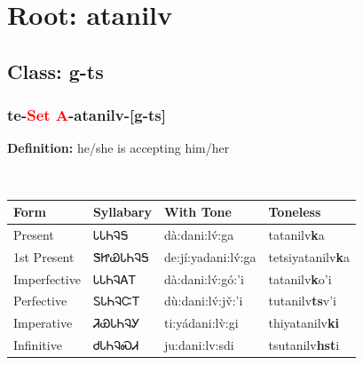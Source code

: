 \needspace{4in}
\section*{Root: atanilv}
\nopagebreak
{}
\needspace{3in}
\subsection*{Class: g-ts}
\nopagebreak
\needspace{2in}
\subsubsection*{te{-}\textcolor{Red}{Set A}{-}\textbf{atanilv}{-}[g-ts]}
\nopagebreak
\textbf{Definition: } he/she is accepting him/her
\\[0.5em]
\begin{tabularx}{\textwidth}{l X X X}%
\toprule%
\textbf{Form}&\textbf{Syllabary}&\textbf{With Tone}&\textbf{Toneless}\\%
\midrule%
Present&ᏓᏓᏂᎸᎦ&dà:dani:lv́:ga&tatanilv\textbf{k}a\\%
1st Present&ᏕᏥᏯᏓᏂᎸᎦ&de:jí:yadani:lv́:ga&tetsiyatanilv\textbf{k}a\\%
Imperfective&ᏓᏓᏂᎸᎪᎢ&dà:dani:lv́:gó:’i&tatanilv\textbf{k}o'i\\%
Perfective&ᏚᏓᏂᎸᏨᎢ&dù:dani:lv́:jv̌:’i&tutanilv\textbf{ts}v'i\\%
Imperative&ᏘᏯᏓᏂᎸᎩ&ti:yádani:lv̀:gi&thiyatanilv\textbf{ki}\\%
Infinitive&ᏧᏓᏂᎸᏍᏗ&ju:dani:lv:sdi&tsutanilv\textbf{hst}i\\%
\bottomrule%
\end{tabularx}
\\[1em]